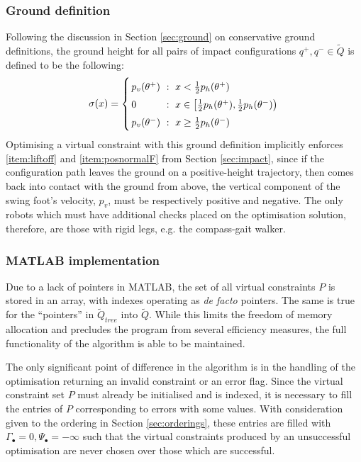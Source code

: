 \subsubsection{Ground definition}
Following the discussion in Section \ref{sec:ground} on conservative ground definitions, the ground height for all pairs of impact configurations $q^+, q^- \in \tilde{Q}$ is defined to be the following:
\begin{equation}
	\arraycolsep=1.4pt\def\arraystretch{1.5}
	\sigma(x) = \left\{
		\begin{array}{l c l}
			p_v(\theta^+) &~:~& x < \tfrac{1}{2}p_h(\theta^+) \\
			0 &~:~& x \in \left[\tfrac{1}{2}p_h(\theta^+), \tfrac{1}{2}p_h(\theta^-)\right) \\
			p_v(\theta^-) &~:~& x \geq \tfrac{1}{2}p_h(\theta^-)
		\end{array}
	\right.
\end{equation}
Optimising a virtual constraint with this ground definition implicitly enforces \ref{item:liftoff} and \ref{item:posnormalF} from Section \ref{sec:impact}, since if the configuration path leaves the ground on a positive-height trajectory, then comes back into contact with the ground from above, the vertical component of the swing foot's velocity, $p_v$, must be respectively positive and negative. The only robots which must have additional checks placed on the optimisation solution, therefore, are those with rigid legs, e.g. the compass-gait walker.

\subsubsection{MATLAB implementation}
Due to a lack of pointers in MATLAB, the set of all virtual constraints $P$ is stored in an array, with indexes operating as \textit{de facto} pointers. The same is true for the ``pointers'' in $\tilde{Q}_{tree}$ into $\tilde{Q}$. While this limits the freedom of memory allocation and precludes the program from several efficiency measures, the full functionality of the algorithm is able to be maintained.

The only significant point of difference in the algorithm is in the handling of the optimisation returning an invalid constraint or an error flag. Since the virtual constraint set $P$ must already be initialised and is indexed, it is necessary to fill the entries of $P$ corresponding to errors with some values. With consideration given to the ordering in Section \ref{sec:orderings}, these entries are filled with $\Gamma_\bullet = 0, \Psi_\bullet=-\infty$ such that the virtual constraints produced by an unsuccessful optimisation are never chosen over those which are successful.